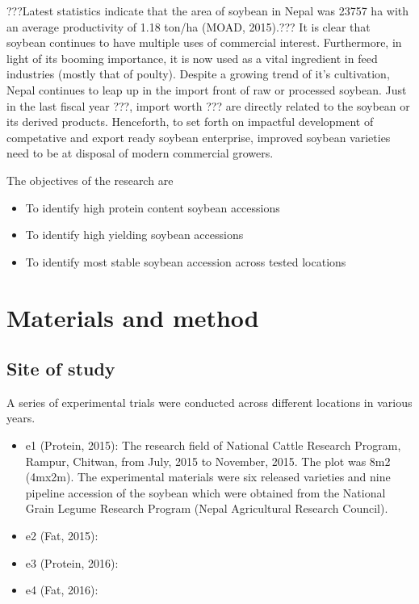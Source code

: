 \documentclass[
]{article}
\providecommand{\tightlist}{%
  \setlength{\itemsep}{0pt}\setlength{\parskip}{0pt}}
\begin{document}
???Latest statistics indicate that the area of soybean in Nepal was 23757 ha with an average productivity of 1.18 ton/ha (MOAD, 2015).??? It is clear that soybean continues to have multiple uses of commercial interest. Furthermore, in light of its booming importance, it is now used as a vital ingredient in feed industries (mostly that of poulty). Despite a growing trend of it's cultivation, Nepal continues to leap up in the import front of raw or processed soybean. Just in the last fiscal year ???, import worth ??? are directly related to the soybean or its derived products. Henceforth, to set forth on impactful development of competative and export ready soybean enterprise, improved soybean varieties need to be at disposal of modern commercial growers.

The objectives of the research are

\begin{itemize}
\tightlist
\item
  To identify high protein content soybean accessions
\item
  To identify high yielding soybean accessions
\item
  To identify most stable soybean accession across tested locations
\end{itemize}

\hypertarget{materials-and-method}{%
\section{Materials and method}\label{materials-and-method}}

\hypertarget{site-of-study}{%
\subsection{Site of study}\label{site-of-study}}

A series of experimental trials were conducted across different locations in various years.

\begin{itemize}
\item
  e1 (Protein, 2015): The research field of National Cattle Research Program, Rampur, Chitwan, from July, 2015 to November, 2015. The plot was 8m2 (4mx2m). The experimental materials were six released varieties and nine pipeline accession of the soybean which were obtained from the National Grain Legume Research Program (Nepal Agricultural Research Council).
\item
  e2 (Fat, 2015):
\item
  e3 (Protein, 2016):
\item
  e4 (Fat, 2016):
\end{itemize}
\end{document}
